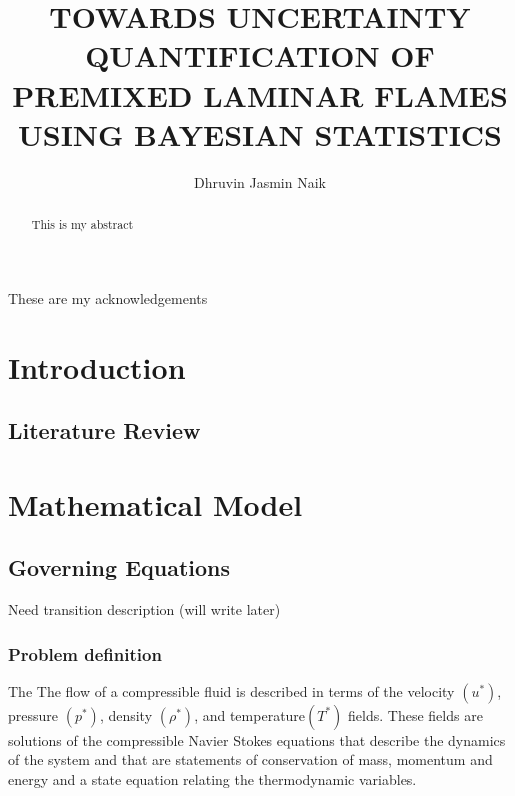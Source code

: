 \documentclass[10pt]{ubthesis}
\title{TOWARDS UNCERTAINTY QUANTIFICATION OF PREMIXED LAMINAR FLAMES USING BAYESIAN STATISTICS}
\author{Dhruvin Jasmin Naik}
\begin{document}
\begin{titlepage}
\maketitle
\end{titlepage}

\begin{ubfrontmatter}
\makecopyright
\cleardoublepage
\begin{acknowledgements}
These are my acknowledgements
\end{acknowledgements}
\tableofcontents

\cleardoublepage
\listoffigures
\cleardoublepage
\listoftables
\cleardoublepage
\begin{abstract}
This is my abstract
\end{abstract}
\end{ubfrontmatter}

\chapter{Introduction}
\section{Literature Review}
\chapter{Mathematical Model}
\section{Governing Equations}
Need transition description (will write later)
\subsection{Problem definition}
The The flow of a compressible fluid is described in terms of the velocity $(u^*)$, pressure $(p^*)$, density $(\rho^*)$, and temperature$(T^*)$ fields. These fields are solutions of the compressible Navier Stokes equations that describe the dynamics of the system
and that are statements of conservation of mass, momentum and energy and a state equation relating the thermodynamic variables.  
\end{document}
